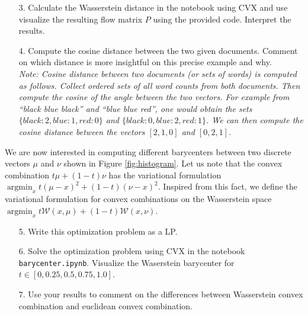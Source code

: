 \documentclass[11pt]{article}
\begin{document}
\begin{enumerate}
\item[3.] Calculate the Wasserstein distance in the notebook using CVX and use visualize the resulting flow matrix $P$ using the provided code. Interpret the results.

\item[4.] Compute the cosine distance between the two given documents. Comment on which distance is more insightful on this precise example and why.\\

\textit{Note: Cosine distance between two documents (or sets of words) is computed as follows. Collect ordered sets of all word counts from both documents. Then compute the cosine of the angle between the two vectors. For example from ``black blue black'' and ``blue blue red'', one would obtain the sets $\{black: 2, blue: 1, red: 0\}$ and $\{black: 0, blue: 2, red: 1\}$. We can then compute the cosine distance between the vectors $[2,1,0]$ and $[0, 2, 1]$.}


\end{enumerate}

We are now interested in computing different barycenters between two discrete vectors $\mu$ and $\nu$ shown in Figure \ref{fig:histogram}. Let us note that the convex combination $t \mu + (1-t) \nu$ has the variational formulation $\operatorname{argmin}_x t(\mu - x)^2 + (1-t) (\nu-x)^2$. Inspired from this fact, we define the variational formulation for convex combinations on the Wasserstein space $\operatorname{argmin}_x t \mathcal{W}(x, \mu) + (1-t) \mathcal{W}(x, \nu)$.

\begin{enumerate}

\item[5.] Write this optimization problem as a LP.

\item[6.] Solve the optimization problem using CVX in the notebook \verb+barycenter.ipynb+. Visualize the Waserstein barycenter for $t \in [0, 0.25, 0.5, 0.75, 1.0]$.

\item[7.] Use your results to comment on the differences between Wasserstein convex combination and euclidean convex combination.
\end{enumerate}
\end{document}

